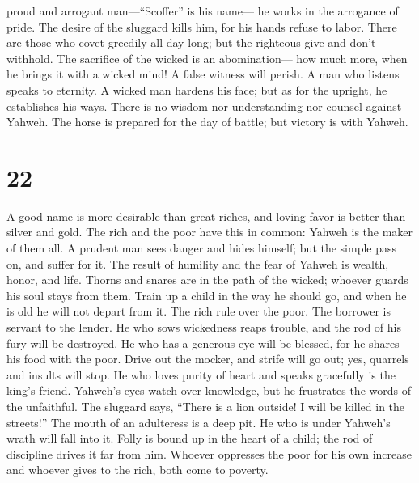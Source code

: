 proud and arrogant man---``Scoffer'' is his name--- he works in the
arrogance of pride.  The desire of the sluggard kills
him, for his hands refuse to labor.  There are those who
covet greedily all day long; but the righteous give and don't withhold.
 The sacrifice of the wicked is an abomination--- how
much more, when he brings it with a wicked mind!  A false
witness will perish. A man who listens speaks to eternity.
 A wicked man hardens his face; but as for the upright,
he establishes his ways.  There is no wisdom nor
understanding nor counsel against Yahweh.  The horse is
prepared for the day of battle; but victory is with Yahweh.

\hypertarget{section-21}{%
\section{22}\label{section-21}}

 A good name is more desirable than great riches, and
loving favor is better than silver and gold.  The rich and
the poor have this in common: Yahweh is the maker of them all.
 A prudent man sees danger and hides himself; but the
simple pass on, and suffer for it.  The result of humility
and the fear of Yahweh is wealth, honor, and life.  Thorns
and snares are in the path of the wicked; whoever guards his soul stays
from them.  Train up a child in the way he should go, and
when he is old he will not depart from it.  The rich rule
over the poor. The borrower is servant to the lender.  He
who sows wickedness reaps trouble, and the rod of his fury will be
destroyed.  He who has a generous eye will be blessed, for
he shares his food with the poor.  Drive out the mocker,
and strife will go out; yes, quarrels and insults will stop.
 He who loves purity of heart and speaks gracefully is
the king's friend.  Yahweh's eyes watch over knowledge,
but he frustrates the words of the unfaithful.  The
sluggard says, ``There is a lion outside! I will be killed in the
streets!''  The mouth of an adulteress is a deep pit. He
who is under Yahweh's wrath will fall into it.  Folly is
bound up in the heart of a child; the rod of discipline drives it far
from him.  Whoever oppresses the poor for his own
increase and whoever gives to the rich, both come to poverty.

